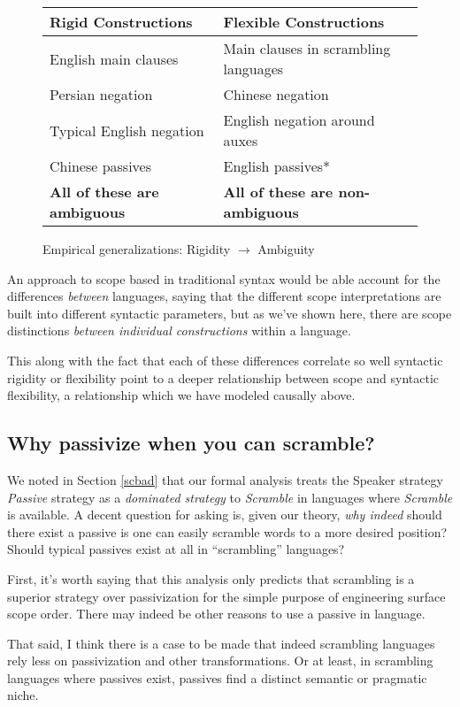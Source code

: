 \documentclass{article}
\begin{document}
\begin{figure}
\begin{tabular}{ll}
	Rigid Constructions & Flexible Constructions \\\hline\hline
	English main clauses & Main clauses in scrambling languages \\
	Persian negation & Chinese negation \\
	Typical English negation & English negation around auxes \\
	Chinese passives & English passives*\\
	\textbf{All of these are ambiguous} & \textbf{All of these are non-ambiguous}\\
\end{tabular}
	\caption{Empirical generalizations: Rigidity ${\rightarrow}$ Ambiguity}
\end{figure}

An approach to scope based in traditional syntax would be able account for the differences \emph{between} languages, saying that the different scope interpretations are built into different syntactic parameters, but as we've shown here, there are scope distinctions \emph{between individual constructions} within a language.

This along with the fact that each of these differences correlate so well syntactic rigidity or flexibility point to a deeper relationship between scope and syntactic flexibility, a relationship which we have modeled causally above.

\subsection{Why passivize when you can scramble?\label{passscr}}

We noted in Section \ref{scbad} that our formal analysis treats the Speaker strategy \textit{Passive} strategy as a \emph{dominated strategy} to \textit{Scramble} in languages where \textit{Scramble} is available.
A decent question for asking is, given our theory, \emph{why indeed} should there exist a passive is one can easily scramble words to a more desired position? Should typical passives exist at all in ``scrambling'' languages?

First, it's worth saying that this analysis only predicts that scrambling is a superior strategy over passivization for the simple purpose of engineering surface scope order.
There may indeed be other reasons to use a passive in language.

That said, I think there is a case to be made that indeed scrambling languages rely less on passivization and other transformations.
Or at least, in scrambling languages where passives exist, passives find a distinct semantic or pragmatic niche.
\end{document}
